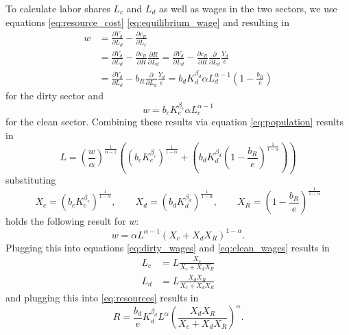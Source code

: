 To calculate labor shares $L_c$ and $L_d$ as well as wages in the two sectors, we use equations \eqref{eq:resource_cost} \eqref{eq:equilibrium_wage} and resulting in
\begin{align}
	w &= \frac{\partial Y_d}{\partial L_d} - \frac{\partial c_R}{\partial L_c} \nonumber \\
	&= \frac{\partial Y_d}{\partial L_d} - \frac{\partial c_R}{\partial R} \frac{\partial R}{\partial L_d} \nonumber = \frac{\partial Y_d}{\partial L_d} - \frac{\partial c_R}{\partial R} \frac{\partial}{\partial L_d} \frac{Y_d}{e} \nonumber \\
	&= \frac{\partial Y_d}{\partial L_d} - b_R \frac{\partial}{\partial L_d} \frac{Y_d}{e} = b_d K_d^{\beta_d} \alpha L_d^{\alpha-1}\left( 1-\frac{b_R}{e} \right)
	\label{eq:dirty_wages}
\end{align}
for the dirty sector and
\begin{equation}
	w = b_c K_c^{\beta_c} \alpha L_c^{\alpha-1}
	\label{eq:clean_wages}
\end{equation}
for the clean sector. Combining these results via equation \eqref{eq:population} results in
\begin{equation}
	L = \left( \frac{w}{\alpha} \right)^{\frac{1}{\alpha-1}}\left( \left( b_c K_c^{\beta_c} \right)^{\frac{1}{1-\alpha}} + \left( b_d K_d^{\beta_d} \left( 1 - \frac{b_R}{e} \right)^{\frac{1}{1-\alpha}} \right) \right)
\end{equation}
substituting 
\begin{equation}
	X_c = (b_c K_c^{\beta_c})^{\frac{1}{1-\alpha}}, \qquad X_d = (b_d K_d^{\beta_d})^{\frac{1}{1-\alpha}}, \qquad X_R = \left( 1 - \frac{b_R}{e} \right)^{\frac{1}{1-\alpha}}
	\label{eq:substitutions}
\end{equation}
holds the following result for $w$:
\begin{equation}
	w = \alpha L^{\alpha-1}\left( X_c + X_d X_R \right)^{1-\alpha}.
	\label{eq:wage_result}
\end{equation}
Plugging this into equations \eqref{eq:dirty_wages} and \eqref{eq:clean_wages} results in 
\begin{align}
	L_c &= L \frac{X_c}{X_c + X_d X_R} \label{eq:clean_labor} \\
	L_d &= L \frac{X_d X_R}{X_c + X_d X_R} \label{eq:dirty_labor}
\end{align}
and plugging this into \eqref{eq:resources} results in
\begin{equation}
	R = \frac{b_d}{e}K_d^{\beta_d}L^{\alpha}\left( \frac{X_d X_R}{X_c + X_d X_R} \right)^{\alpha}.
	\label{eq:R_result}
\end{equation}
